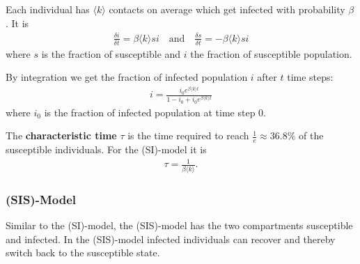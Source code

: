 \documentclass[english]{panikzettel}
\begin{document}
\begin{figure}[ht!]
	\centering
\end{figure}

Each individual has $ \langle k \rangle $ contacts on average which get infected with probability $ \beta $.
It is 
\begin{align*}
	\frac{\delta i}{\delta t} = \beta \langle k \rangle si \quad\text{and}\quad \frac{\delta s}{\delta t} = -\beta \langle k \rangle si
\end{align*}
where $ s $ is the fraction of susceptible and $ i $ the fraction of susceptible population.

By integration we get the fraction of infected population $ i $ after $ t $ time steps:
\begin{align*}
	i = \frac{i_0 e^{\beta \langle k \rangle t}}{1 - i_0 + i_0 e^{\beta \langle k \rangle t}}
\end{align*}
where $ i_0 $ is the fraction of infected population at time step 0.

The \textbf{characteristic time} $ \tau $ is the time required to reach $ \frac{1}{e} \approx 36.8\% $ of the susceptible individuals.
For the (SI)-model it is
\begin{align*}
	\tau = \frac{1}{\beta \langle k \rangle}.
\end{align*}

\subsubsection{(SIS)-Model} \label{sec:sis_model}
Similar to the (SI)-model, the (SIS)-model has the two compartments susceptible and infected.
In the (SIS)-model infected individuals can recover and thereby switch back to the susceptible state.

\begin{figure}[ht!]
	\centering
\end{figure}
\end{document}
